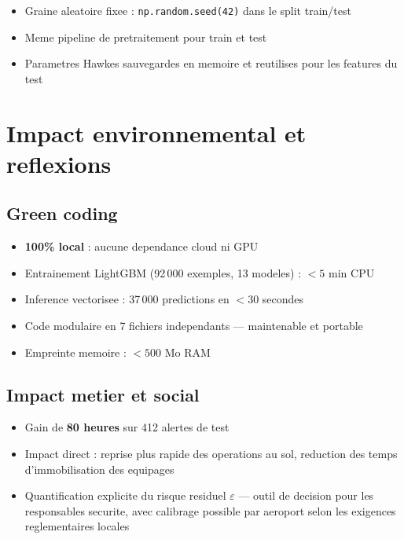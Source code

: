 \documentclass[a4paper,11pt]{article}
\begin{document}
\begin{itemize}
  \item Graine aleatoire fixee : \texttt{np.random.seed(42)} dans le split
        train/test
  \item Meme pipeline de pretraitement pour train et test
  \item Parametres Hawkes sauvegardes en memoire et reutilises pour les features
        du test
\end{itemize}

\section{Impact environnemental et reflexions}

\subsection{Green coding}

\begin{itemize}
  \item \textbf{100\% local} : aucune dependance cloud ni GPU
  \item Entrainement LightGBM (92\,000 exemples, 13 modeles) : $< 5$ min CPU
  \item Inference vectorisee : 37\,000 predictions en $< 30$ secondes
  \item Code modulaire en 7 fichiers independants --- maintenable et portable
  \item Empreinte memoire : $< 500$ Mo RAM
\end{itemize}

\subsection{Impact metier et social}

\begin{itemize}
  \item Gain de \textbf{80 heures} sur 412 alertes de test
  \item Impact direct : reprise plus rapide des operations au sol, reduction des
        temps d'immobilisation des equipages
  \item Quantification explicite du risque residuel $\varepsilon$ --- outil de
        decision pour les responsables securite, avec calibrage possible par
        aeroport selon les exigences reglementaires locales
\end{itemize}
\end{document}
